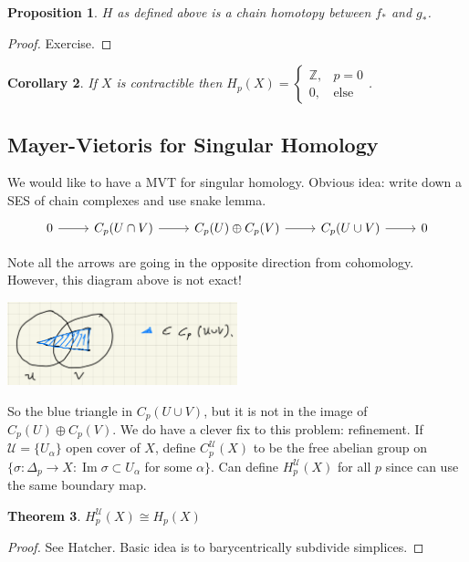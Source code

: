 \documentclass[10pt]{article}
\theoremstyle{plain}
\newtheorem{thm}{Theorem}[section] %
\newtheorem{corollary}[thm]{Corollary}
\newtheorem{prop}[thm]{Proposition}
\theoremstyle{definition}
\newcommand{\chartU}{\mathcal{U}}
\DeclareMathOperator{\Ima}{Im}
\newcommand{\mycasesthing}[2]{\begin{cases} #1 \\ #2\end{cases}}
\newcommand{\mysection}[1]{
    \setcounter{thm}{0}
    \section*{#1}
    \addcontentsline{toc}{section}{#1}
    \addtocounter{section}{1}
    \setcounter{subsection}{0}

}
\newcommand{\mysubsection}[1]{
    \subsection{#1}
}
\begin{document}
\begin{prop}
   $H$ as defined above is a chain homotopy between $f_*$ and $g_*$.
\end{prop}
\begin{proof}
    Exercise.
\end{proof}

\begin{corollary}
    If $X$ is contractible then $H_p(X) =\mycasesthing{ \mathbb{Z},& p= 0}{0,&\text{else}} $.
\end{corollary}

\mysubsection{Mayer-Vietoris for Singular Homology}
We would like to have a MVT for singular homology. Obvious idea: write down a SES of chain complexes and use snake lemma. $$%
\begin{tikzcd}
0 \arrow[r] & C_p(U\cap V) \arrow[r] & C_p(U)\oplus C_p(V) \arrow[r] & C_p(U\cup V) \arrow[r] & 0
\end{tikzcd}$$

Note all the arrows are going in the opposite direction from cohomology. However, this diagram above is not exact!
\begin{center}
    \includegraphics[width = 0.5\textwidth]{Images/MayerVietorisNotExactSingularHomology.png}
\end{center}
So the blue triangle in $C_p(U\cup V)$, but it is not in the image of $C_p(U)\oplus C_p(V)$. We do have a clever fix to this problem: refinement. If $\chartU = \{ U_\alpha\}$ open cover of $X$, define $C_p^\chartU(X)$ to be the free abelian group on $\{\sigma : \Delta_p\to X : \Ima \sigma \subset U_\alpha $ for some $\alpha\}$. Can define $H^\chartU_p(X) $ for all $p$ since can use the same boundary map.

\begin{thm}
    $H^\chartU_p(X) \cong H_p(X)$
\end{thm}
\begin{proof}
    See Hatcher. Basic idea is to barycentrically subdivide simplices.
\end{proof}
\end{document}
